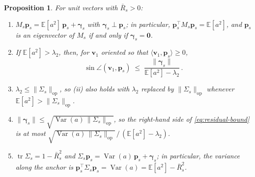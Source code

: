 \documentclass[10pt,letterpaper]{article}
\newtheorem{proposition}{Proposition}
\newcommand{\E}{\mathbb{E}}
\newcommand{\Rbar}{\bar{R}}
\newcommand{\anchor}{\bm{p}}
\begin{document}
\begin{proposition}\label{prop:anchor}
For unit vectors with $\Rbar_s>0$:
\begin{enumerate}
\item[(i)] $M_s\anchor_s=\E[a^{2}]\,\anchor_s+\bm{\gamma}_s$ with $\bm{\gamma}_s\perp\anchor_s$;
  in particular, $\anchor_s^{\top}M_s\anchor_s=\E[a^{2}]$, and $\anchor_s$ is an eigenvector of
  $M_s$ if and only if $\bm{\gamma}_s=\bm{0}$.
\item[(ii)] If $\E[a^{2}]>\lambda_2$, then, for $\bm{v}_1$ oriented so that
  $\langle\bm{v}_1,\anchor_s\rangle\geq0$,
  \begin{equation}\label{eq:residual-bound}
    \sin\angle(\bm{v}_1,\anchor_s)\;\leq\;\frac{\lVert\bm{\gamma}_s\rVert}{\E[a^{2}]-\lambda_2}\,.
  \end{equation}
\item[(iii)] $\lambda_2\leq\lVert\Sigma_s\rVert_{\mathrm{op}}$, so (ii) also holds with
  $\lambda_2$ replaced by $\lVert\Sigma_s\rVert_{\mathrm{op}}$ whenever
  $\E[a^{2}]>\lVert\Sigma_s\rVert_{\mathrm{op}}$.
\item[(iv)] $\lVert\bm{\gamma}_s\rVert\leq\sqrt{\operatorname{Var}(a)\,\lVert\Sigma_s\rVert_{\mathrm{op}}}$,
  so the right-hand side of \cref{eq:residual-bound} is at most
  $\sqrt{\operatorname{Var}(a)\,\lVert\Sigma_s\rVert_{\mathrm{op}}}\,/\,(\E[a^{2}]-\lambda_2)$.
\item[(v)] $\operatorname{tr}\Sigma_s=1-\Rbar_s^{2}$ and
  $\Sigma_s\anchor_s=\operatorname{Var}(a)\,\anchor_s+\bm{\gamma}_s$; in particular, the variance
  along the anchor is $\anchor_s^{\top}\Sigma_s\anchor_s=\operatorname{Var}(a)=\E[a^{2}]-\Rbar_s^{2}$.
\end{enumerate}
\end{proposition}
\end{document}

